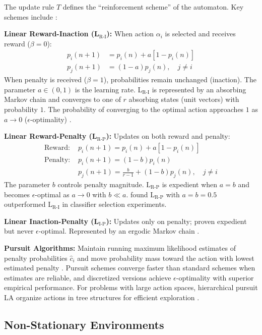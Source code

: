 \documentclass[12pt,oneside]{book}
\begin{document}
The update rule $T$ defines the ``reinforcement scheme'' of the automaton. Key schemes include \citep{Narendra1989, Lakshmivarahan1973}:

\textbf{Linear Reward-Inaction (L$_\text{R-I}$):} When action $\alpha_i$ is selected and receives reward ($\beta = 0$):
\begin{align}
    p_i(n+1) &= p_i(n) + a[1 - p_i(n)] \\
    p_j(n+1) &= (1-a) p_j(n), \quad j \neq i
\end{align}
When penalty is received ($\beta = 1$), probabilities remain unchanged (inaction). The parameter $a \in (0, 1)$ is the learning rate. L$_\text{R-I}$ is represented by an absorbing Markov chain and converges to one of $r$ absorbing states (unit vectors) with probability $1$. The probability of converging to the optimal action approaches $1$ as $a \rightarrow 0$ ($\epsilon$-optimality) \citep{Narendra1989}.

\textbf{Linear Reward-Penalty (L$_\text{R-P}$):} Updates on both reward and penalty:
\begin{align}
    \text{Reward: } & p_i(n+1) = p_i(n) + a[1 - p_i(n)] \\
    \text{Penalty: } & p_i(n+1) = (1-b) p_i(n) \\
    & p_j(n+1) = \frac{b}{r-1} + (1-b) p_j(n), \quad j \neq i
\end{align}
The parameter $b$ controls penalty magnitude. L$_\text{R-P}$ is expedient when $a = b$ and becomes $\epsilon$-optimal as $a \rightarrow 0$ with $b \ll a$. \citet{Savargiv2021} found L$_\text{R-P}$ with $a = b = 0.5$ outperformed L$_\text{R-I}$ in classifier selection experiments.

\textbf{Linear Inaction-Penalty (L$_\text{I-P}$):} Updates only on penalty; proven expedient but never $\epsilon$-optimal. Represented by an ergodic Markov chain \citep{Narendra1989}.

\textbf{Pursuit Algorithms:} Maintain running maximum likelihood estimates of penalty probabilities $\hat{c}_i$ and move probability mass toward the action with lowest estimated penalty \citep{ThathacharSastry2002}. Pursuit schemes converge faster than standard schemes when estimates are reliable, and discretized versions achieve $\epsilon$-optimality with superior empirical performance. For problems with large action spaces, hierarchical pursuit LA organize actions in tree structures for efficient exploration \citep{Yazidi2018}.

\subsection{Non-Stationary Environments}
\label{subsec:nse}
\end{document}

